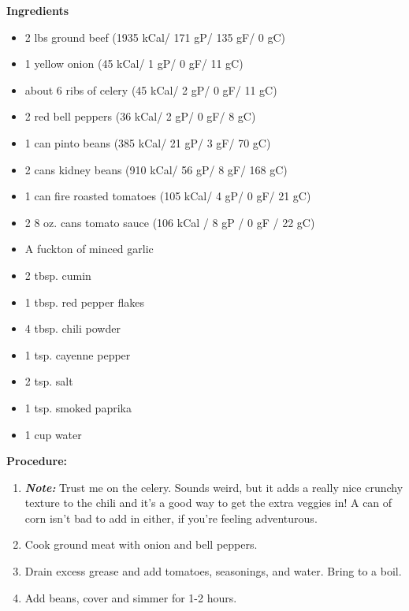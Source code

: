 \begin{multicols}{2}
\textbf{Ingredients}
\begin{itemize}
\item 2 lbs ground beef \quad (1935 kCal/ 171 gP/ 135 gF/ 0 gC)
\item 1 yellow onion \quad (45 kCal/ 1 gP/ 0 gF/ 11 gC)
\item about 6 ribs of celery \quad (45 kCal/ 2 gP/ 0 gF/ 11 gC)
\item 2 red bell peppers  \quad (36 kCal/ 2 gP/ 0 gF/ 8 gC)
\item 1 can pinto beans \quad (385 kCal/ 21 gP/ 3 gF/ 70 gC)
\item 2 cans kidney beans \quad (910 kCal/ 56 gP/ 8 gF/ 168 gC)
\item 1 can fire roasted tomatoes \newline   (105 kCal/ 4 gP/ 0 gF/ 21 gC)
\item 2 8 oz. cans tomato sauce \newline (106 kCal / 8 gP / 0 gF / 22 gC)
\item A fuckton of minced garlic
\item 2 tbsp. cumin
\item 1 tbsp. red pepper flakes
\item 4 tbsp. chili powder
\item 1 tsp. cayenne pepper
\item 2 tsp. salt
\item 1 tsp. smoked paprika
\item 1 cup water 



\end{itemize}


\columnbreak
\textbf{Procedure:}

\begin{enumerate}
\item \textit{\textbf{Note:}} Trust me on the celery. Sounds weird, but it adds a really nice crunchy texture to the chili and it's a good way to get the extra veggies in! A can of corn isn't bad to add in either, if you're feeling adventurous.
\item Cook ground meat with onion and bell peppers. 

\item Drain excess grease and add tomatoes, seasonings, and water. Bring to a boil. 

\item Add beans, cover and simmer for 1-2 hours. 


\end{enumerate}
\end{multicols}
